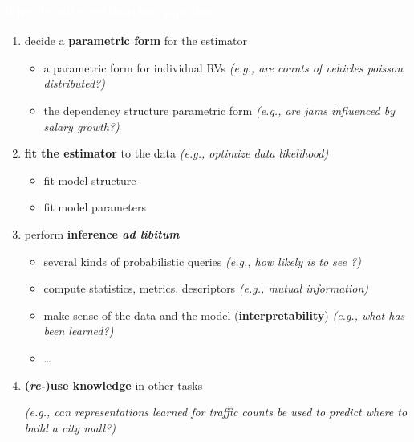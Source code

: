 \documentclass[xcolor={usenames,dvipsnames,svgnames}, compress]{beamer}
\newcommand{\highlighttext}[2][yellow]{{\colorbox{#1}{\textcolor{white}{#2}}}}
\begin{document}
\begin{frame}[t]
  \frametitle{\highlighttext[bgrey2]{The density estimation pipeline}}
  \footnotesize
  
  \begin{enumerate}
    \setlength{\itemindent}{0pt}
  \item decide a \textbf{parametric form} for the estimator
    \begin{itemize}
      \setlength{\itemindent}{-10pt}
      \scriptsize
    \item  a parametric form for individual RVs \hfill{%
    \scriptsize \emph{\color{bgrey4}(e.g., are counts of vehicles poisson distributed?)}}
\item the dependency structure parametric form\hfill{
    \scriptsize \emph{\color{bgrey4}(e.g., are jams influenced by
      salary growth?)}}
    \end{itemize}
  \item \textbf{fit the estimator} to the data \hfill{
        \scriptsize \emph{\color{bgrey4}(e.g., optimize data likelihood)}}
    \begin{itemize}
      \setlength{\itemindent}{-10pt}
      \scriptsize
    \item fit model structure 
      \item fit model parameters
    \end{itemize}
  \item perform \textbf{inference \emph{ad libitum}}
    \begin{itemize}\scriptsize
      \setlength{\itemindent}{-10pt}
    \item several kinds of probabilistic queries \hfill{
    \scriptsize \emph{\color{bgrey4}(e.g., how likely is to see ?)}}
    \item compute statistics, metrics, descriptors\hfill{
        \scriptsize \emph{\color{bgrey4}(e.g., mutual information)}}
      \item make sense of the data and the model (\textbf{interpretability})\hfill{
        \scriptsize \emph{\color{bgrey4}(e.g., what has been learned?)}}
      \item\dots
    \end{itemize}
  

    \item \textbf{(\emph{re-})use knowledge} in other tasks \hfill\begin{minipage}{0.57\linewidth}
  \vspace{10pt}
      \raggedleft
      \scriptsize \emph{\color{bgrey4}(e.g., can representations
          learned for traffic counts be used to predict where to build
          a city mall?)}
\end{minipage}%
  \end{enumerate}
\end{frame}
\end{document}
